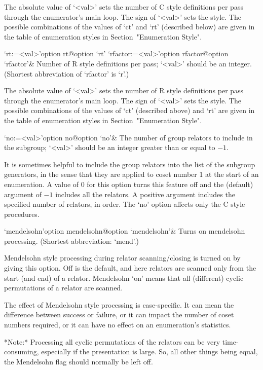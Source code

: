 The absolute value of `<val>' sets the
number of C style definitions per  pass through  the enumerator's main
loop. The sign of `<val>'  sets the  style. The possible  combinations
of the values of `ct' and  `rt'  (described below)  are  given in  the
table of  enumeration styles in Section~"Enumeration Style".

\>`rt:=<val>'{option rt}@{option `rt'}
\>`rfactor:=<val>'{option rfactor}@{option `rfactor'}&
Number of R style definitions per pass; `<val>' should be an  integer. 
(Shortest abbreviation of `rfactor' is `r'.)

The absolute value of `<val>' sets the
number of R style definitions per  pass through  the enumerator's main
loop. The sign of `<val>'  sets the  style. The possible  combinations
of the values of `ct' (described above)  and  `rt'  are  given in  the
table of  enumeration styles in Section~"Enumeration Style".

\>`no:=<val>'{option no}@{option `no'}&
The number of group relators to include in the subgroup;  
`<val>' should be an integer greater than or equal to $-1$.

It is sometimes helpful to include the group relators into the list of
the subgroup generators, in the sense that they are applied  to  coset
number 1 at the start of an enumeration. A value of 0 for this  option
turns this feature off and the (default) argument of $-1$ includes all
the relators. A positive argument includes  the  specified  number  of
relators,  in  order.  The  `no'  option  affects  only  the   C style
procedures.

\>`mendelsohn'{option mendelsohn}@{option `mendelsohn'}&
Turns on mendelsohn processing. (Shortest abbreviation: `mend'.)

Mendelsohn style processing during relator scanning/closing is  turned
on by giving this option. Off is the default, and  here  relators  are
scanned only from  the  start  (and  end)  of  a  relator.  Mendelsohn
\lq{}on' means that all (different) cyclic permutations of  a  relator
are scanned.

The effect of Mendelsohn style processing  is  case-specific.  It  can
mean the difference between success or failure, or it can  impact  the
number of coset numbers required, or it  can  have  no  effect  on  an
enumeration's statistics.

*Note:* Processing all cyclic permutations of the relators can be very
time-consuming,  especially if  the  presentation is  large.  So,  all
other things being equal, the  Mendelsohn flag should normally be left
off.

